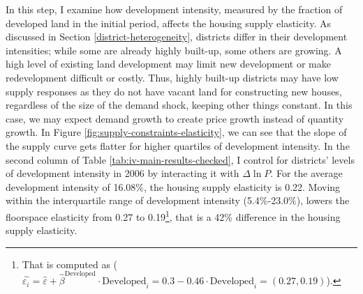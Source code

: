 \documentclass[
  12pt,
]{article}
\begin{document}
In this step, I examine how development intensity, measured by the fraction of developed land in the initial period, affects the housing supply elasticity. As discussed in Section \ref{district-heterogeneity}, districts differ in their development intensities; while some are already highly built-up, some others are growing. A high level of existing land development may limit new development or make redevelopment difficult or costly. Thus, highly built-up districts may have low supply responses as they do not have vacant land for constructing new houses, regardless of the size of the demand shock, keeping other things constant. In this case, we may expect demand growth to create price growth instead of quantity growth. In Figure \ref{fig:supply-constraints-elasticity}, we can see that the slope of the supply curve gets flatter for higher quartiles of development intensity. In the second column of Table \ref{tab:iv-main-results-checked}, I control for districts' levels of development intensity in 2006 by interacting it with \(\Delta\ln P\). For the average development intensity of 16.08\%, the housing supply elasticity is 0.22. Moving within the interquartile range of development intensity (5.4\%-23.0\%), lowers the floorspace elasticity from 0.27 to 0.19\footnote{That is computed as (\(\widehat{\varepsilon_i} = \widehat{\varepsilon} + \widehat{\beta}^{\text{Developed}}\cdot\text{Developed}_i = 0.3 -0.46 \cdot\text{Developed}_i = (0.27, 0.19)\)).}, that is a 42\% difference in the housing supply elasticity.
\end{document}
